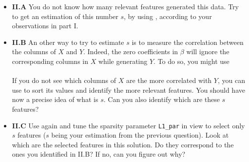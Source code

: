 \documentclass[DIN, pagenumber=false, fontsize=11pt, parskip=half]{scrartcl}
\begin{document}
\begin{itemize}
  \item \textbf{II.A} You do not know how many relevant features generated this data.
  Try to get an estimation of this number $s$, by using , according to your observations in part I.

  \item \textbf{II.B} An other way to try to estimate $s$ is to measure the correlation between the columns of $X$ and $Y$.
  Indeed, the zero coefficients in $\beta$ will ignore the corresponding columns in $X$ while generating $Y$.
  To do so, you might use\\
  \\
  If you do not see which columns of $X$ are the more correlated with $Y$, you can use  to sort its values and identify the more relevant features.
You should have now a precise idea of what is $s$.
Can you also identify which are these $s$ features?

  \item \textbf{II.C} Use again  and tune the sparsity parameter \texttt{L1\_par} in view to select only $s$ features ($s$ being your estimation from the previous question).
  Look at which are the selected features in this solution.
  Do they correspond to the ones you identified in II.B?
  If no, can you figure out why?\\
\end{itemize}
\end{document}
